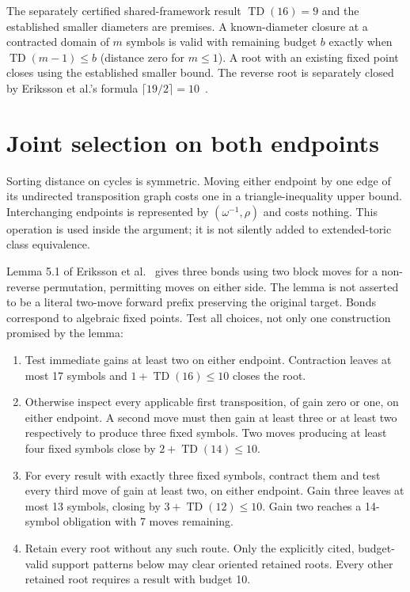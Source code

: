 \documentclass[11pt,a4paper]{article}
\newcommand{\TD}{\operatorname{TD}}
\begin{document}
The separately certified shared-framework result $\TD(16)=9$ and the established smaller diameters are premises.
A known-diameter closure at a contracted domain of $m$ symbols is valid with
remaining budget $b$ exactly when $\TD(m-1)\leq b$ (distance zero for $m\leq1$).
A root with an existing fixed point closes using the established smaller bound.
The reverse root is separately closed by Eriksson et al.'s formula
$\lceil 19/2\rceil=10$~\cite{eriksson}.

\section{Joint selection on both endpoints}
Sorting distance on cycles is symmetric. Moving either endpoint by one edge
of its undirected transposition graph costs one in a triangle-inequality upper
bound. Interchanging endpoints is represented by $(\omega^{-1},\rho)$ and
costs nothing. This operation is used inside the argument; it is not silently
added to extended-toric class equivalence.

Lemma 5.1 of Eriksson et al.~\cite{eriksson} gives three bonds using two block
moves for a non-reverse permutation, permitting moves on either side. The
lemma is not asserted to be a literal two-move forward prefix preserving the
original target. Bonds correspond to algebraic fixed points. Test all choices,
not only one construction promised by the lemma:
\begin{enumerate}
\item Test immediate gains at least two on either endpoint. Contraction leaves
at most 17 symbols and $1+\TD(16)\leq 10$ closes the root.
\item Otherwise inspect every applicable first transposition, of gain zero or
one, on either endpoint. A second move must then gain at least three or at least
two respectively to produce three fixed symbols. Two moves producing at least
four fixed symbols close by $2+\TD(14)\leq 10$.
\item For every result with exactly three fixed symbols, contract them and test
every third move of gain at least two, on either endpoint. Gain three leaves at
most 13 symbols, closing by $3+\TD(12)\leq 10$. Gain two
reaches a 14-symbol obligation with 7 moves remaining.
\item Retain every root without any such route. Only the explicitly cited,
budget-valid support patterns below may clear oriented retained roots. Every
other retained root requires a result with budget 10.
\end{enumerate}
\end{document}
